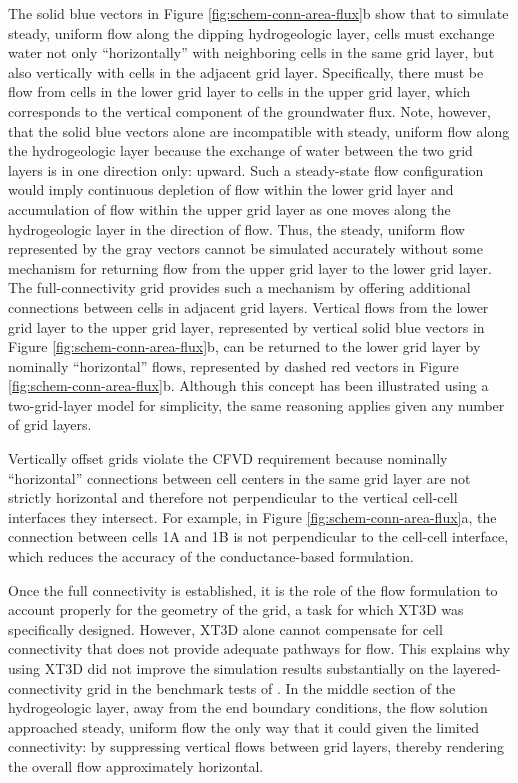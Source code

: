 \documentclass{article}
\begin{document}
The solid blue vectors in Figure \ref{fig:schem-conn-area-flux}b show that to simulate steady, uniform flow along the dipping hydrogeologic layer, cells must exchange water not only ``horizontally'' with neighboring cells in the same grid layer, but also vertically with cells in the adjacent grid layer. Specifically, there must be flow from cells in the lower grid layer to cells in the upper grid layer, which corresponds to the vertical component of the groundwater flux. Note, however, that the solid blue vectors alone are incompatible with steady, uniform flow along the hydrogeologic layer because the exchange of water between the two grid layers is in one direction only: upward. Such a steady-state flow configuration would imply continuous depletion of flow within the lower grid layer and accumulation of flow within the upper grid layer as one moves along the hydrogeologic layer in the direction of flow. Thus, the steady, uniform flow represented by the gray vectors cannot be simulated accurately without some mechanism for returning flow from the upper grid layer to the lower grid layer. The full-connectivity grid provides such a mechanism by offering additional connections between cells in adjacent grid layers. Vertical flows from the lower grid layer to the upper grid layer, represented by vertical solid blue vectors in Figure \ref{fig:schem-conn-area-flux}b, can be returned to the lower grid layer by nominally ``horizontal'' flows, represented by dashed red vectors in Figure \ref{fig:schem-conn-area-flux}b. Although this concept has been illustrated using a two-grid-layer model for simplicity, the same reasoning applies given any number of grid layers.

Vertically offset grids violate the CFVD requirement because nominally ``horizontal'' connections between cell centers in the same grid layer are not strictly horizontal and therefore not perpendicular to the vertical cell-cell interfaces they intersect. For example, in Figure \ref{fig:schem-conn-area-flux}a, the connection between cells 1A and 1B is not perpendicular to the cell-cell interface, which reduces the accuracy of the conductance-based formulation.

Once the full connectivity is established, it is the role of the flow formulation to account properly for the geometry of the grid, a task for which XT3D was specifically designed. However, XT3D alone cannot compensate for cell connectivity that does not provide adequate pathways for flow. This explains why using XT3D did not improve the simulation results substantially on the layered-connectivity grid in the benchmark tests of \cite{bardot2023}.  In the middle section of the hydrogeologic layer, away from the end boundary conditions, the flow solution approached steady, uniform flow the only way that it could given the limited connectivity: by suppressing vertical flows between grid layers, thereby rendering the overall flow approximately horizontal.
\end{document}
